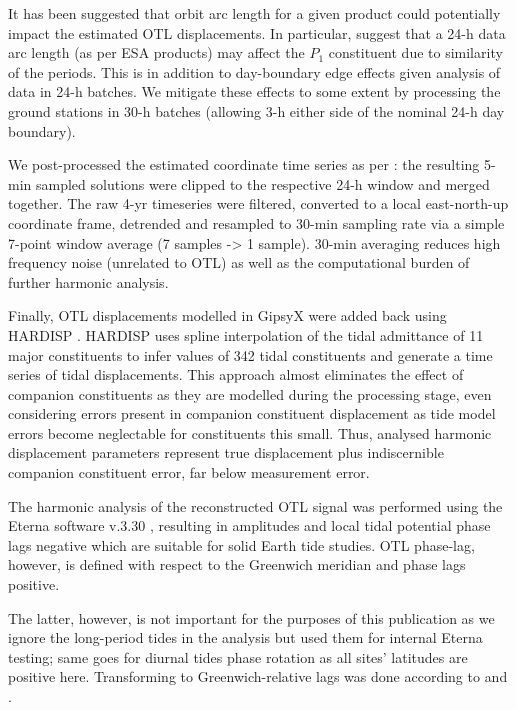 \documentclass[se, manuscript]{copernicus}
\begin{document}
It has been suggested that orbit arc length for a given product could potentially impact the estimated OTL displacements. In particular, \cite{Ito2011} suggest that a 24-h data arc length (as per ESA products) may affect the $P_1$ constituent due to similarity of the periods. This is in addition to day-boundary edge effects given analysis of data in 24-h batches. We mitigate these effects to some extent by processing the ground stations in 30-h batches (allowing 3-h either side of the nominal 24-h day boundary).

We post-processed the estimated coordinate time series as per \cite{Penna2015}: the resulting 5-min sampled solutions were clipped to the respective 24-h window and merged together. The raw 4-yr timeseries were filtered, converted to a local east-north-up coordinate frame, detrended and resampled to 30-min sampling rate via a simple 7-point window average (7 samples -> 1 sample). 30-min averaging reduces high frequency noise (unrelated to OTL) as well as the computational burden of further harmonic analysis.

Finally, OTL displacements modelled in GipsyX were added back using HARDISP \citep{IERS2010}. HARDISP uses spline interpolation of the tidal admittance of 11 major constituents to infer values of 342 tidal constituents and generate a time series of tidal displacements. This approach almost eliminates the effect of companion constituents \citep{Foreman1989} as they are modelled during the processing stage, even considering errors present in companion constituent displacement as tide model errors become neglectable for constituents this small. Thus, analysed harmonic displacement parameters represent true displacement plus indiscernible companion constituent error, far below measurement error.

The harmonic analysis of the reconstructed OTL signal was performed using the Eterna software v.3.30 \citep{Wenzel1996}, resulting in amplitudes and local tidal potential phase lags negative which are suitable for solid Earth tide studies. OTL phase-lag, however, is defined with respect to the Greenwich meridian and phase lags positive.

The latter, however, is not important for the purposes of this publication as we ignore the long-period tides in the analysis but used them for internal Eterna testing; same goes for diurnal tides phase rotation as all sites’ latitudes are positive here. Transforming to Greenwich-relative lags was done according to \cite{Boy2003} and \cite{Bos2000}.
\end{document}
